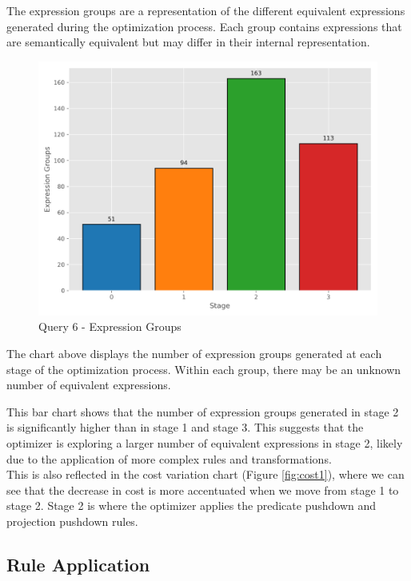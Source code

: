 \documentclass[a4paper,12pt]{scrreprt}
\begin{document}
The expression groups are a representation of the different equivalent expressions generated during the optimization process. Each group contains expressions that are semantically equivalent but may differ in their internal representation. 

\begin{figure}[H]
    \centering
    \includegraphics[width=\linewidth]{img/expression_groups/q6_expression_groups.png}
    \caption{Query 6 - Expression Groups}
    \label{fig:exprgroups1}
\end{figure}

The chart above displays the number of expression groups generated at each stage of the optimization process. Within each group, there may be an unknown number of equivalent expressions. 

This bar chart shows that the number of expression groups generated in stage 2 is significantly higher than in stage 1 and stage 3. This suggests that the optimizer is exploring a larger number of equivalent expressions in stage 2, likely due to the application of more complex rules and transformations. \\
This is also reflected in the cost variation chart (Figure \ref{fig:cost1}), where we can see that the decrease in cost is more accentuated when we move from stage 1 to stage 2.
Stage 2 is where the optimizer applies the predicate pushdown and projection pushdown rules. 

\subsection{Rule Application}
\end{document}
